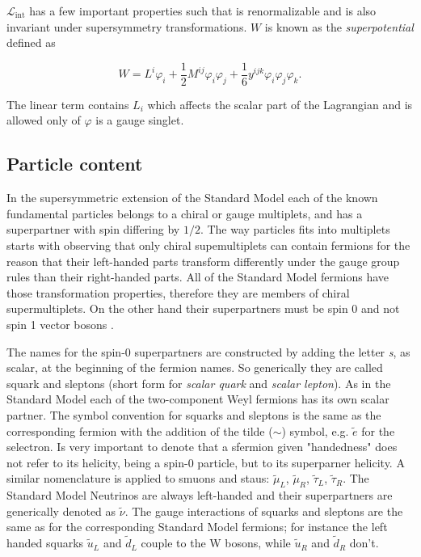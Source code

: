  $\mathcal{L}_{\mathrm{int}}$ has a few important properties such that is renormalizable and is also invariant under supersymmetry transformations. $W$ is known as the \textit{superpotential} defined as 

\begin{equation}
W = L^i\varphi_i + \frac{1}{2}M^{ij}\varphi_i\varphi_j + \frac{1}{6}y^{ijk}\varphi_i\varphi_j\varphi_k.
\label{eq::superpotential}
\end{equation}

The linear term contains $L_i$ which affects the scalar part of the Lagrangian and is allowed only of $\varphi$ is a gauge singlet.


\subsection{Particle content}

\FloatBarrier

In the supersymmetric extension of the Standard Model each of the known fundamental particles belongs to a chiral or gauge multiplets, and has a superpartner with spin differing by $1/2$. The way particles fits into multiplets starts with observing that only chiral supemultiplets can contain fermions for the reason that their left-handed parts transform differently under the gauge group rules than their right-handed parts. All of the Standard Model fermions have those transformation properties, therefore they are members of chiral supermultiplets. On the other hand their superpartners must be spin 0 and not spin 1 vector bosons \cite{Martin:1997ns}.

The names for the spin-0 superpartners are constructed by adding the letter \textit{s}, as scalar, at the beginning of the fermion names. So generically they are called squark and sleptons (short form for \textit{scalar quark} and \textit{scalar lepton}). As in the Standard Model each of the two-component Weyl fermions has its own scalar partner. The symbol convention for squarks and sleptons is the same as the corresponding fermion with the addition of the tilde ($\sim$) symbol, e.g. $\widetilde{e}$ for the selectron. Is very important to denote that a sfermion given "handedness" does not refer to its helicity, being a spin-0 particle, but to its superparner helicity. A similar nomenclature is applied to smuons and staus: $\widetilde{\mu}_{L}$, $\widetilde{\mu}_{R}$, $\widetilde{\tau}_{L}$, $\widetilde{\tau}_{R}$. The Standard Model Neutrinos are always left-handed and their superpartners are generically denoted as $\widetilde{\nu}$. The gauge interactions of squarks and sleptons are the same as for the corresponding Standard Model fermions; for instance the left handed squarks $\widetilde{u}_{L}$ and $\widetilde{d}_{L}$ couple to the W bosons, while $\widetilde{u}_{R}$ and $\widetilde{d}_{R}$ don't.

